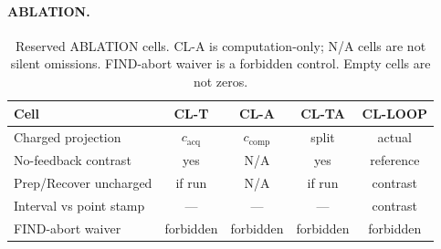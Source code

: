 \paragraph{ABLATION.}
\begin{table}[!t]
\centering
\caption{Reserved ABLATION cells. CL-A is computation-only; N/A cells are not
silent omissions. FIND-abort waiver is a forbidden control. Empty cells are
not zeros.}
\label{tab:res-ablation}
\scriptsize
\begin{tabular}{@{}lcccc@{}}
\hline
Cell & CL-T & CL-A & CL-TA & CL-LOOP \\
\hline
Charged projection & \(c_{\mathrm{acq}}\) & \(c_{\mathrm{comp}}\) & split & actual \\
No-feedback contrast & yes & N/A & yes & reference \\
Prep/Recover uncharged & if run & N/A & if run & contrast \\
Interval vs point stamp & --- & --- & --- & contrast \\
FIND-abort waiver & forbidden & forbidden & forbidden & forbidden \\
\hline
\end{tabular}
\end{table}
